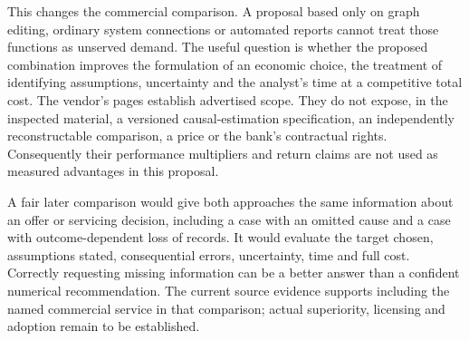 This changes the commercial comparison. A proposal based only on graph editing,
ordinary system connections or automated reports cannot treat those functions
as unserved demand. The useful question is whether the proposed combination
improves the formulation of an economic choice, the treatment of identifying
assumptions, uncertainty and the analyst's time at a competitive total cost.
The vendor's pages establish advertised scope. They do not expose, in the
inspected material, a versioned causal-estimation specification, an independently
reconstructable comparison, a price or the bank's contractual rights.
Consequently their performance multipliers and return claims are not used as
measured advantages in this proposal. \citep{survey29causalens}

A fair later comparison would give both approaches the same information about
an offer or servicing decision, including a case with an omitted cause and a
case with outcome-dependent loss of records. It would evaluate the target
chosen, assumptions stated, consequential errors, uncertainty, time and full
cost. Correctly requesting missing information can be a better answer than a
confident numerical recommendation. The current source evidence supports
including the named commercial service in that comparison; actual superiority,
licensing and adoption remain to be established.
